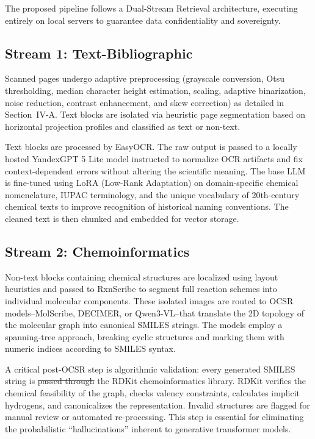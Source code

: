 \documentclass[conference]{IEEEtran}
\makeatletter
\providecommand{\DIFadd}[1]{{\protect\color{blue}\uwave{#1}}} %
\providecommand{\DIFdel}[1]{{\protect\color{red}\sout{#1}}} %
\providecommand{\DIFaddbegin}{} %
\providecommand{\DIFaddend}{} %
\providecommand{\DIFdelbegin}{} %
\providecommand{\DIFdelend}{} %
\providecommand{\DIFscaledelfig}{0.5}
\newlength{\DIFdelgraphicswidth} %
\newlength{\DIFdelgraphicsheight} %
\providecommand{\DIFaddincludegraphics}[2][]{{\color{blue}\fbox{\DIFOincludegraphics[#1]{#2}}}} %
\providecommand{\DIFdelincludegraphics}[2][]{%
\sbox{\DIFdelgraphicsbox}{\DIFOincludegraphics[#1]{#2}}%
\settoboxwidth{\DIFdelgraphicswidth}{\DIFdelgraphicsbox} %
\settoboxtotalheight{\DIFdelgraphicsheight}{\DIFdelgraphicsbox} %
\scalebox{\DIFscaledelfig}{%
\parbox[b]{\DIFdelgraphicswidth}{\usebox{\DIFdelgraphicsbox}\\[-\baselineskip] \rule{\DIFdelgraphicswidth}{0em}}\llap{\resizebox{\DIFdelgraphicswidth}{\DIFdelgraphicsheight}{%
\setlength{\unitlength}{\DIFdelgraphicswidth}%
\begin{picture}(1,1)%
\thicklines\linethickness{2pt} %
{\color[rgb]{1,0,0}\put(0,0){\framebox(1,1){}}}%
{\color[rgb]{1,0,0}\put(0,0){\line( 1,1){1}}}%
{\color[rgb]{1,0,0}\put(0,1){\line(1,-1){1}}}%
\end{picture}%
}\hspace*{3pt}}} %
} %
\DeclareRobustCommand{\DIFaddbegin}{\DIFOaddbegin \let\includegraphics\DIFaddincludegraphics} %
\DeclareRobustCommand{\DIFaddend}{\DIFOaddend \let\includegraphics\DIFOincludegraphics} %
\DeclareRobustCommand{\DIFdelbegin}{\DIFOdelbegin \let\includegraphics\DIFdelincludegraphics} %
\DeclareRobustCommand{\DIFdelend}{\DIFOaddend \let\includegraphics\DIFOincludegraphics} %
\let\sout@orig\sout %
\renewcommand{\sout}[1]{\ifmmode\text{\sout@orig{\ensuremath{#1}}}\else\sout@orig{#1}\fi} %
\makeatother
\begin{document}
The proposed pipeline follows a Dual-Stream Retrieval architecture, executing entirely on local servers to guarantee data confidentiality and sovereignty.

\subsection{Stream 1: Text-Bibliographic}

Scanned pages undergo adaptive preprocessing (grayscale conversion, Otsu thresholding, median character height estimation, scaling, adaptive binarization, noise reduction, contrast enhancement, and skew correction) as detailed in Section~IV-A. Text blocks are isolated via heuristic page segmentation based on horizontal projection profiles and classified as text or non-text.

Text blocks are processed by EasyOCR. The raw output is passed to a locally hosted YandexGPT 5 Lite model \DIFaddbegin \DIFadd{that is }\DIFaddend instructed to normalize OCR artifacts and fix context-dependent errors without altering the scientific meaning. The base LLM is fine-tuned using LoRA (Low-Rank Adaptation) on domain-specific chemical nomenclature, IUPAC terminology, and the unique vocabulary of 20th-century chemical texts to improve recognition of historical naming conventions. The cleaned text is then chunked and embedded for vector storage.

\subsection{Stream 2: Chemoinformatics}

Non-text blocks containing chemical structures are localized using layout heuristics and passed to RxnScribe to segment full reaction schemes into individual molecular components. These isolated images are routed to OCSR models--MolScribe, DECIMER, or Qwen3-VL--that translate the 2D topology of the molecular graph into canonical SMILES strings. The models employ a spanning-tree approach, breaking cyclic structures and marking them with numeric indices according to SMILES syntax.

A critical post-OCSR step is algorithmic validation: every generated SMILES string is \DIFdelbegin \DIFdel{passed through }\DIFdelend \DIFaddbegin \DIFadd{processed by }\DIFaddend the RDKit chemoinformatics library. RDKit verifies the chemical feasibility of the graph, checks valency constraints, calculates implicit hydrogens, and canonicalizes the representation. Invalid structures are flagged for manual review or automated re-processing. This step is essential for eliminating the probabilistic ``hallucinations'' inherent to generative transformer models.
\end{document}
